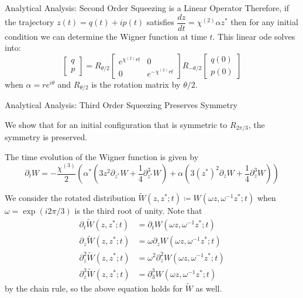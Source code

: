 \documentclass[final]{beamer}
\newcommand*{\wigner}{W(\omega z, \omega^{-1}z^{*};t)}
\newlength{\colwidth}
\begin{document}
\begin{frame}[t]
\begin{columns}[t]
\begin{column}{\colwidth}
\begin{block}{Analytical Analysis: Second Order Squeezing is a Linear Operator}
        Therefore, if the trajectory $z(t)=q(t)+ip(t)$ satisfies $\dfrac{dz}{dt}=\chi^{(2)}\alpha z^{*}$
        then for any initial condition we can determine the Wigner function at time $t$.
        This linear ode solves into:
        \[
          \begin{bmatrix}
            q \\
            p
          \end{bmatrix}
          =
          R_{\theta/2}
          \begin{bmatrix}
            e^{\chi^{(2)}rt} & 0                 \\
            0                & e^{-\chi^{(2)}rt}
          \end{bmatrix}
          R_{-\theta/2}
          \begin{bmatrix}
            q(0) \\
            p(0)
          \end{bmatrix}
        \]
        when $\alpha=re^{i\theta}$ and $R_{\theta/2}$ is the rotation matrix by $\theta/2$.

      \end{block}

      \begin{block}{Analytical Analysis: Third Order Squeezing Preserves Symmetry}

        We show that for an initial configuration that is symmetric to $R_{2\pi/3}$, the symmetry is preserved.

        The time evolution of the Wigner function is given by
        \[\partial_{t}W=-\frac{\chi^{(3)}}{2}\left(\alpha^{*}\left(3z^{2}\partial_{z^{*}}W+\frac{1}{4}\partial_{z^{*}}^{3}W\right)+\alpha\left(3(z^{*})^{2}\partial_{z}W+\frac{1}{4}\partial_{z}^{3}W\right)\right)\]

        We consider the rotated distribution $\tilde{W}(z,z^{*};t)\coloneq W(\omega z, \omega^{-1}z^{*};t)$ when $\omega=\exp(i2\pi/3)$ is the third root of unity.
        Note that
        \begin{align*}
          \partial_{t}\tilde{W}(z,z^{*};t)     & =\partial_{t}\wigner               \\
          \partial_{z}\tilde{W}(z,z^{*};t)     & =\omega\partial_{z}\wigner         \\
          \partial_{z}^{2}\tilde{W}(z,z^{*};t) & =\omega^{2}\partial_{z}^{2}\wigner \\
          \partial_{z}^{3}\tilde{W}(z,z^{*};t) & =\partial_{3}^{3}\wigner
        \end{align*}
        by the chain rule, so the above equation holds for $\tilde{W}$ as well.


\end{block}
\end{column}
\end{columns}
\end{frame}
\end{document}
